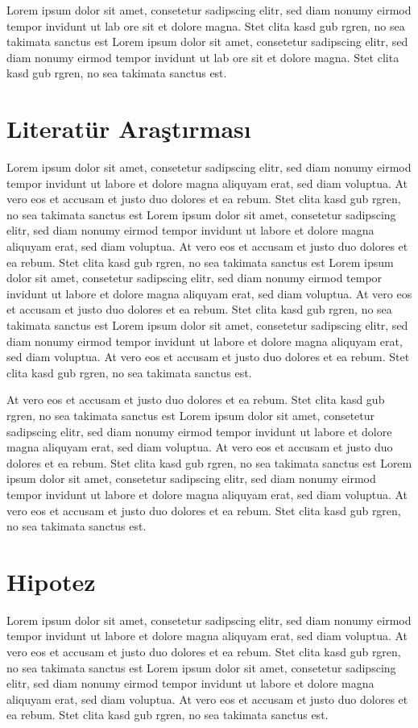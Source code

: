 Lorem ipsum dolor sit amet, consetetur sadipscing elitr, sed diam nonumy eirmod tempor invidunt ut lab ore sit et dolore magna. Stet clita kasd gub rgren, no sea takimata sanctus est Lorem ipsum dolor sit amet, consetetur sadipscing elitr, sed diam nonumy eirmod tempor invidunt ut lab ore sit et dolore magna. Stet clita kasd gub rgren, no sea takimata sanctus est.

\section{Literatür Araştırması}
Lorem ipsum dolor sit amet, consetetur sadipscing elitr, sed diam nonumy eirmod tempor invidunt ut labore et dolore magna aliquyam erat, sed diam voluptua. At vero eos et accusam et justo duo dolores et ea rebum. Stet clita kasd gub rgren, no sea takimata sanctus est Lorem ipsum dolor sit amet, consetetur sadipscing elitr, sed diam nonumy eirmod tempor invidunt ut labore et dolore magna aliquyam erat, sed diam voluptua. At vero eos et accusam et justo duo dolores et ea rebum. Stet clita kasd gub rgren, no sea takimata sanctus est Lorem ipsum dolor sit amet, consetetur sadipscing elitr, sed diam nonumy eirmod tempor invidunt ut labore et dolore magna aliquyam erat, sed diam voluptua. At vero eos et accusam et justo duo dolores et ea rebum. Stet clita kasd gub rgren, no sea takimata sanctus est Lorem ipsum dolor sit amet, consetetur sadipscing elitr, sed diam nonumy eirmod tempor invidunt ut labore et dolore magna aliquyam erat, sed diam voluptua. At vero eos et accusam et justo duo dolores et ea rebum. Stet clita kasd gub rgren, no sea takimata sanctus est.

At vero eos et accusam et justo duo dolores et ea rebum. Stet clita kasd gub rgren, no sea takimata sanctus est Lorem ipsum dolor sit amet, consetetur sadipscing elitr, sed diam nonumy eirmod tempor invidunt ut labore et dolore magna aliquyam erat, sed diam voluptua. At vero eos et accusam et justo duo dolores et ea rebum. Stet clita kasd gub rgren, no sea takimata sanctus est Lorem ipsum dolor sit amet, consetetur sadipscing elitr, sed diam nonumy eirmod tempor invidunt ut labore et dolore magna aliquyam erat, sed diam voluptua. At vero eos et accusam et justo duo dolores et ea rebum. Stet clita kasd gub rgren, no sea takimata sanctus est.

\section{Hipotez}
Lorem ipsum dolor sit amet, consetetur sadipscing elitr, sed diam nonumy eirmod tempor invidunt ut labore et dolore magna aliquyam erat, sed diam voluptua. At vero eos et accusam et justo duo dolores et ea rebum. Stet clita kasd gub rgren, no sea takimata sanctus est Lorem ipsum dolor sit amet, consetetur sadipscing elitr, sed diam nonumy eirmod tempor invidunt ut labore et dolore magna aliquyam erat, sed diam voluptua. At vero eos et accusam et justo duo dolores et ea rebum. Stet clita kasd gub rgren, no sea takimata sanctus est.

